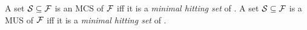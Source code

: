 \begin{proposition}\label{prop:MCS-MUS-hittingset}
%     
    A set  $\mathcal{S} \subseteq \mathcal{F} $ is an MCS of $ \mathcal{F} $ iff  it is a \emph{minimal hitting set} of \muses{\formula}.
% 
    A set  $\mathcal{S} \subseteq \mathcal{F} $ is a MUS of $ \mathcal{F} $ iff  it is a \emph{minimal hitting set} of \mcses{\formula}.
\end{proposition}
 


% 
% 
% 
% 
% 
